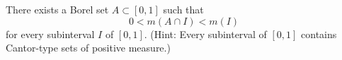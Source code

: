 	\begin{exercise}[Folland 1.33]
		There exists a Borel set $A \subset [0, 1]$ such that 
		\begin{equation}
			0 < m(A \cap I) < m(I)
		\end{equation}
		for every subinterval $I$ of $[0, 1]$. (Hint: Every subinterval of $[0, 1]$ contains Cantor-type sets of positive measure.)
	\end{exercise}
	\begin{solution}

	\end{solution}
